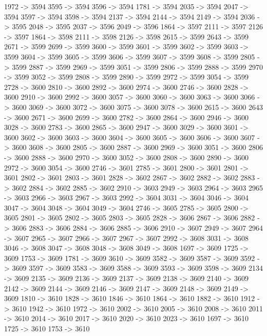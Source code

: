 {	1972 -> 3594
	3595 -> 3594
	3596 -> 3594
	1781 -> 3594
	2035 -> 3594
	2047 -> 3594
	3597 -> 3594
	3598 -> 3594
	2137 -> 3594
	2144 -> 3594
	2149 -> 3594
	2036 -> 3595
	2048 -> 3595
	2037 -> 3596
	2049 -> 3596
	1864 -> 3597
	2111 -> 3597
	2126 -> 3597
	1864 -> 3598
	2111 -> 3598
	2126 -> 3598
	2615 -> 3599
	2643 -> 3599
	2671 -> 3599
	2699 -> 3599
	3600 -> 3599
	3601 -> 3599
	3602 -> 3599
	3603 -> 3599
	3604 -> 3599
	3605 -> 3599
	3606 -> 3599
	3607 -> 3599
	3608 -> 3599
	2805 -> 3599
	2887 -> 3599
	2969 -> 3599
	3051 -> 3599
	2806 -> 3599
	2888 -> 3599
	2970 -> 3599
	3052 -> 3599
	2808 -> 3599
	2890 -> 3599
	2972 -> 3599
	3054 -> 3599
	2728 -> 3600
	2810 -> 3600
	2892 -> 3600
	2974 -> 3600
	2746 -> 3600
	2828 -> 3600
	2910 -> 3600
	2992 -> 3600
	3057 -> 3600
	3060 -> 3600
	3063 -> 3600
	3066 -> 3600
	3069 -> 3600
	3072 -> 3600
	3075 -> 3600
	3078 -> 3600
	2615 -> 3600
	2643 -> 3600
	2671 -> 3600
	2699 -> 3600
	2782 -> 3600
	2864 -> 3600
	2946 -> 3600
	3028 -> 3600
	2783 -> 3600
	2865 -> 3600
	2947 -> 3600
	3029 -> 3600
	3601 -> 3600
	3602 -> 3600
	3603 -> 3600
	3604 -> 3600
	3605 -> 3600
	3606 -> 3600
	3607 -> 3600
	3608 -> 3600
	2805 -> 3600
	2887 -> 3600
	2969 -> 3600
	3051 -> 3600
	2806 -> 3600
	2888 -> 3600
	2970 -> 3600
	3052 -> 3600
	2808 -> 3600
	2890 -> 3600
	2972 -> 3600
	3054 -> 3600
	2746 -> 3601
	2785 -> 3601
	2800 -> 3601
	2801 -> 3601
	2802 -> 3601
	2803 -> 3601
	2828 -> 3602
	2867 -> 3602
	2882 -> 3602
	2883 -> 3602
	2884 -> 3602
	2885 -> 3602
	2910 -> 3603
	2949 -> 3603
	2964 -> 3603
	2965 -> 3603
	2966 -> 3603
	2967 -> 3603
	2992 -> 3604
	3031 -> 3604
	3046 -> 3604
	3047 -> 3604
	3048 -> 3604
	3049 -> 3604
	2746 -> 3605
	2785 -> 3605
	2800 -> 3605
	2801 -> 3605
	2802 -> 3605
	2803 -> 3605
	2828 -> 3606
	2867 -> 3606
	2882 -> 3606
	2883 -> 3606
	2884 -> 3606
	2885 -> 3606
	2910 -> 3607
	2949 -> 3607
	2964 -> 3607
	2965 -> 3607
	2966 -> 3607
	2967 -> 3607
	2992 -> 3608
	3031 -> 3608
	3046 -> 3608
	3047 -> 3608
	3048 -> 3608
	3049 -> 3608
	1697 -> 3609
	1725 -> 3609
	1753 -> 3609
	1781 -> 3609
	3610 -> 3609
	3582 -> 3609
	3587 -> 3609
	3592 -> 3609
	3597 -> 3609
	3583 -> 3609
	3588 -> 3609
	3593 -> 3609
	3598 -> 3609
	2134 -> 3609
	2135 -> 3609
	2136 -> 3609
	2137 -> 3609
	2138 -> 3609
	2140 -> 3609
	2142 -> 3609
	2144 -> 3609
	2146 -> 3609
	2147 -> 3609
	2148 -> 3609
	2149 -> 3609
	1810 -> 3610
	1828 -> 3610
	1846 -> 3610
	1864 -> 3610
	1882 -> 3610
	1912 -> 3610
	1942 -> 3610
	1972 -> 3610
	2002 -> 3610
	2005 -> 3610
	2008 -> 3610
	2011 -> 3610
	2014 -> 3610
	2017 -> 3610
	2020 -> 3610
	2023 -> 3610
	1697 -> 3610
	1725 -> 3610
	1753 -> 3610
}
